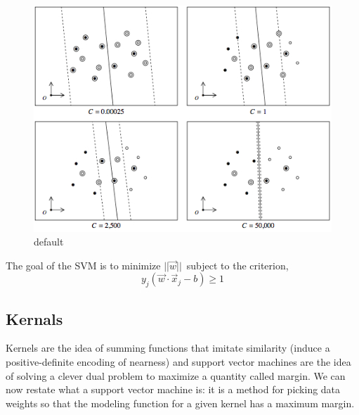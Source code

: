 \documentclass[11pt, oneside]{article}   	%
\newcommand{\vxj}{\vec{x}_{j}}
\newcommand{\yj}{y_{j}}
\begin{document}
\begin{figure}[htbp]
\begin{center}
\includegraphics[]{svm/svmC.png}
\caption{default}
\label{default}
\end{center}
\end{figure}



The goal of the SVM is to minimize $||\vec{w}||$~subject to the criterion,
\begin{equation}
\yj (\vec{w} \cdot \vxj - b) \ge 1
\end{equation}

\subsection{Kernals}
Kernels are the idea of summing functions that imitate similarity (induce a positive-definite encoding of nearness) and support vector machines are the idea of solving a clever dual problem to maximize a quantity called margin. We can now restate what a support vector machine is: it is a method for picking data weights so that the modeling function for a given kernel has a maximum margin.
\end{document}
